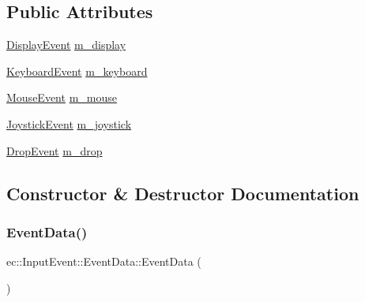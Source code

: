 \subsection*{Public Attributes}
\begin{DoxyCompactItemize}
\item 
\mbox{\hyperlink{structec_1_1_display_event}{Display\+Event}} \mbox{\hyperlink{unionec_1_1_input_event_1_1_event_data_a8389ed647f95275e71ed9ebb0705cbfa}{m\+\_\+display}}
\item 
\mbox{\hyperlink{structec_1_1_keyboard_event}{Keyboard\+Event}} \mbox{\hyperlink{unionec_1_1_input_event_1_1_event_data_a4c4a2bbea6b854c11f2fda34d546c053}{m\+\_\+keyboard}}
\item 
\mbox{\hyperlink{structec_1_1_mouse_event}{Mouse\+Event}} \mbox{\hyperlink{unionec_1_1_input_event_1_1_event_data_ad9e425f64db2c4f1741729f66feb0426}{m\+\_\+mouse}}
\item 
\mbox{\hyperlink{structec_1_1_joystick_event}{Joystick\+Event}} \mbox{\hyperlink{unionec_1_1_input_event_1_1_event_data_a3df014ee916cae08c2c43da4a935642f}{m\+\_\+joystick}}
\item 
\mbox{\hyperlink{structec_1_1_drop_event}{Drop\+Event}} \mbox{\hyperlink{unionec_1_1_input_event_1_1_event_data_a9e9c97bd137c4efc47741b0671c22da0}{m\+\_\+drop}}
\end{DoxyCompactItemize}


\subsection{Constructor \& Destructor Documentation}
\mbox{\label{unionec_1_1_input_event_1_1_event_data_a07feefe51335e0521a10f2032d5a7dbc}} 
\subsubsection{\texorpdfstring{Event\+Data()}{EventData()}}
{\footnotesize\ttfamily ec\+::\+Input\+Event\+::\+Event\+Data\+::\+Event\+Data (\begin{DoxyParamCaption}{ }\end{DoxyParamCaption})\hspace{0.3cm}{\ttfamily [inline]}}

